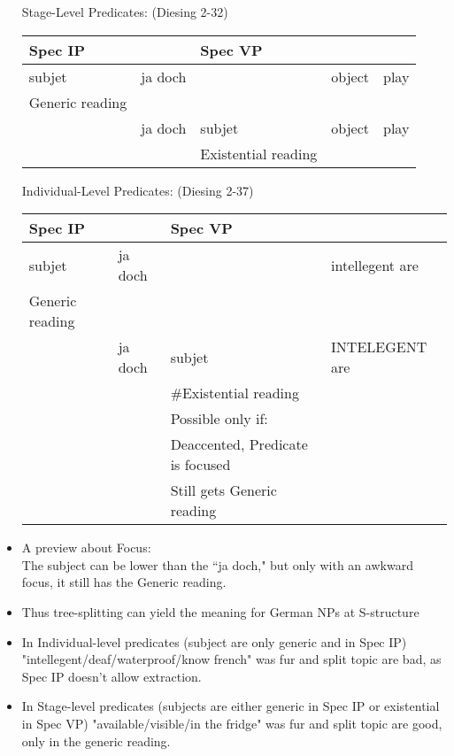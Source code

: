 \documentclass[landscape]{article}
\begin{document}
\begin{itemize}
\begin{example}Stage-Level Predicates: (Diesing 2-32)\\
\begin{tabular}{|l|l|l|l|l|}\hline
Spec IP & & Spec VP&& \\\hline\hline
subjet & ja doch & &  object &play\\
Generic reading&&&&\\\hline
& ja doch & subjet & object & play\\
&  & Existential reading &&\\\hline

\end{tabular}
\end{example}

\begin{example}Individual-Level Predicates: (Diesing 2-37)\\
\begin{tabular}{|l|l|l|l|}\hline
Spec IP & & Spec VP& \\\hline\hline
subjet & ja doch & &  intellegent are\\
Generic reading&&&\\\hline
& ja doch & subjet & INTELEGENT are\\
&  & \#Existential reading &\\
& & Possible only if:&\\
&& Deaccented, Predicate is focused&\\
&& Still gets Generic reading&\\\hline

\end{tabular}
\end{example}

\item A preview about Focus:\\
The subject can be lower than the ``ja doch," but only with an awkward focus, it still has the Generic reading.


\item Thus tree-splitting can yield the meaning for German NPs at S-structure



\item In Individual-level predicates (subject are only generic and in Spec IP)
"intellegent/deaf/waterproof/know french" was fur and split topic are bad, as Spec IP doesn't allow extraction.

\item In Stage-level predicates (subjects are  either generic in Spec IP or existential in Spec VP) "available/visible/in the fridge" was fur and split topic are good, only in the generic reading.

\end{itemize}
\end{document}
